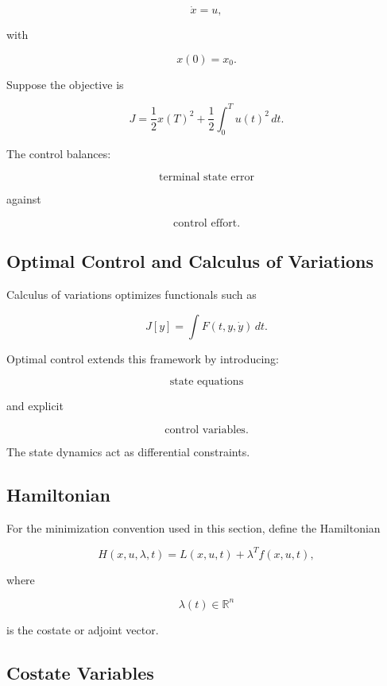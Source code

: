 \[
\boxed{
\dot{x}=u,
}
\]

with

\[
x(0)=x_0.
\]

Suppose the objective is

\[
\boxed{
J
=
\frac12
x(T)^2
+
\frac12
\int_0^T
u(t)^2\,dt.
}
\]

The control balances:

\[
\boxed{
\text{terminal state error}
}
\]

against

\[
\boxed{
\text{control effort}.
}
\]

\subsection{Optimal Control and Calculus of Variations}
\label{subsec:optimal-control-calculus-variations}

Calculus of variations optimizes functionals such as

\[
\boxed{
J[y]
=
\int
F
(
t,
y,
\dot y
)
\,dt.
}
\]

Optimal control extends this framework by introducing:

\[
\boxed{
\text{state equations}
}
\]

and explicit

\[
\boxed{
\text{control variables}.
}
\]

The state dynamics act as differential constraints.

\subsection{Hamiltonian}
\label{subsec:optimal-control-hamiltonian}

For the minimization convention used in this section, define the
Hamiltonian

\[
\boxed{
H(x,u,\lambda,t)
=
L(x,u,t)
+
\lambda^T
f(x,u,t),
}
\]

where

\[
\boxed{
\lambda(t)
\in
\mathbb{R}^n
}
\]

is the costate or adjoint vector.

\subsection{Costate Variables}
\label{subsec:costate-variables}

